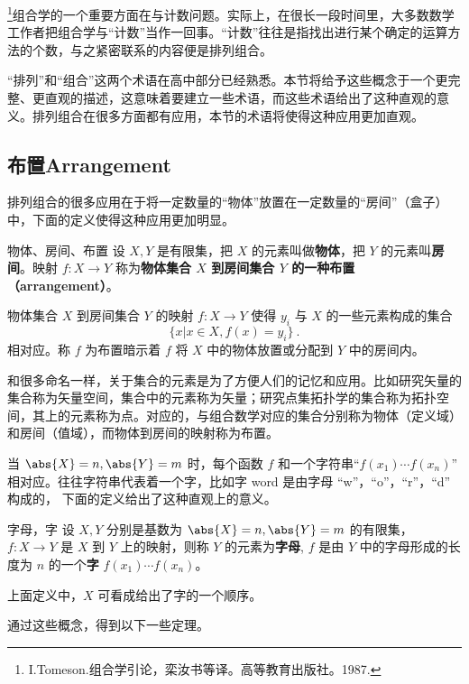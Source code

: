 
\footnote{I.Tomeson.组合学引论，栾汝书等译。高等教育出版社。1987.}组合学的一个重要方面在与计数问题。实际上，在很长一段时间里，大多数数学工作者把组合学与“计数”当作一回事。“计数”往往是指找出进行某个确定的运算方法的个数，与之紧密联系的内容便是排列组合。

“排列”和“组合”这两个术语在高中部分已经熟悉。本节将给予这些概念于一个更完整、更直观的描述，这意味着要建立一些术语，而这些术语给出了这种直观的意义。排列组合在很多方面都有应用，本节的术语将使得这种应用更加直观。
\subsection{布置Arrangement}
排列组合的很多应用在于将一定数量的“物体”放置在一定数量的“房间”（盒子）中，下面的定义使得这种应用更加明显。
\begin{definition}{物体、房间、布置}\label{def_APC_2}
设 $X,Y$ 是有限集，把 $X$ 的元素叫做\textbf{物体}，把 $Y$ 的元素叫\textbf{房间}。映射 $f:X\rightarrow Y$ 称为\textbf{物体集合 $X$ 到房间集合 $Y$ 的一种\textbf{布置}（arrangement）}。
\end{definition}
物体集合 $X$ 到房间集合 $Y$ 的映射 $f:X\rightarrow Y$ 使得 $y_i$ 与 $X$ 的一些元素构成的集合
\begin{equation}
\{x|x\in X,f(x)=y_i\}~.
\end{equation}
相对应。称 $f$ 为布置暗示着 $f$ 将 $X$ 中的物体放置或分配到 $Y$ 中的房间内。

和很多命名一样，关于集合的元素是为了方便人们的记忆和应用。比如研究矢量的集合称为矢量空间，集合中的元素称为矢量；研究点集拓扑学的集合称为拓扑空间，其上的元素称为点。对应的，与组合数学对应的集合分别称为物体（定义域）和房间（值域），而物体到房间的映射称为布置。

当 $\abs{X}=n,\abs{Y}=m$ 时，每个函数 $f$ 和一个字符串“$f(x_1)\cdots f(x_n)$” 相对应。往往字符串代表着一个字，比如字 word 是由字母 “w”，“o”，“r”，“d” 构成的， 下面的定义给出了这种直观上的意义。
\begin{definition}{字母，字}\label{def_APC_1}
设 $X,Y$ 分别是基数为 $\abs{X}=n,\abs{Y}=m$ 的有限集， $f:X\rightarrow Y$ 是 $X$ 到 $Y$ 上的映射，则称 $Y$ 的元素为\textbf{字母}, $f$ 是由 $Y$ 中的字母形成的长度为 $n$ 的一个\textbf{字} $f(x_1)\cdots f(x_n)$。
\end{definition}
上面定义中，$X$ 可看成给出了字的一个顺序。

通过这些概念，得到以下一些定理。

